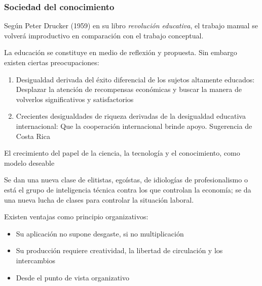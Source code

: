 \subsubsection{Sociedad del conocimiento}
Según Peter Drucker (1959) en su libro \textit{revolución educativa}, el trabajo manual se volverá improductivo en comparación con el trabajo conceptual.

La educación se constituye en medio de reflexión y propuesta. Sin embargo existen ciertas preocupaciones:
\begin{enumerate}
    \item Desigualdad derivada del éxito diferencial de los sujetos altamente educados: Desplazar la atención de recompensas económicas y buscar la manera de volverlos significativos y satisfactorios
    \item Crecientes desigualdades de riqueza derivadas de la desigualdad educativa internacional: Que la cooperación internacional brinde apoyo. Sugerencia de Costa Rica
\end{enumerate}

El crecimiento del papel de la ciencia, la tecnología y el conocimiento, como modelo deseable
\begin{center}
\end{center}
Se dan una nueva clase de elitistas, egoístas, de idiologías de profesionalismo o está el grupo de inteligencia técnica contra los que controlan la economía; se da una nueva lucha de clases para controlar la situación laboral.

Existen ventajas como principio organizativos:
\begin{itemize}
    \item Su aplicación no supone desgaste, si no multiplicación
    \item Su producción requiere creatividad, la libertad de circulación y los intercambios
    \item Desde el punto de vista organizativo
\end{itemize}

